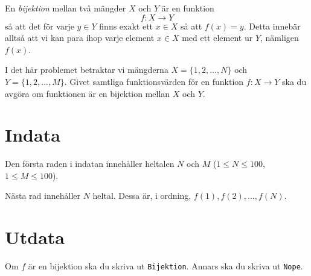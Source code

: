 
En \emph{bijektion} mellan två mängder $X$ och $Y$ är en funktion $$f : X \rightarrow Y$$ så att det för varje $y \in Y$ finns exakt ett $x \in X$ så att $f(x) = y$. Detta innebär alltså att vi kan para ihop varje element $x \in X$ med ett element ur $Y$, nämligen $f(x)$.

I det här problemet betraktar vi mängderna $X = \{1, 2, ..., N\}$ och $Y = \{1, 2, ..., M\}$. Givet samtliga funktionsvärden för en funktion $f : X \rightarrow Y$ ska du avgöra om funktionen är en bijektion mellan $X$ och $Y$.

\section*{Indata}
Den första raden i indatan innehåller heltalen $N$ och $M$ ($1 \le N \le 100$, $1 \le M \le 100$).

Nästa rad innehåller $N$ heltal. Dessa är, i ordning, $f(1), f(2), ..., f(N)$.

\section*{Utdata}
Om $f$ är en bijektion ska du skriva ut \texttt{Bijektion}. Annars ska du skriva ut \texttt{Nope}.
